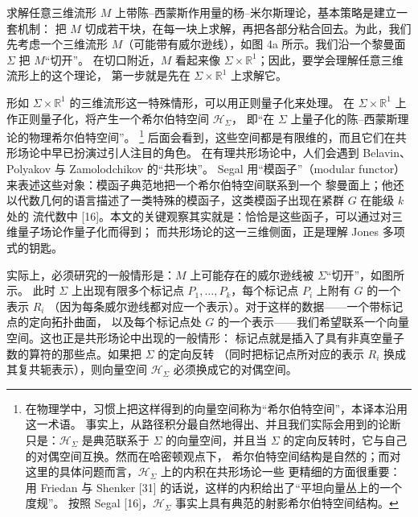 \documentclass[11pt,a4paper]{article}
\begin{document}
求解任意三维流形 $M$ 上带陈–西蒙斯作用量的杨–米尔斯理论，基本策略是建立一套机制：
把 $M$ 切成若干块，在每一块上求解，再把各部分粘合回去。为此，我们先考虑一个三维流形
$M$（可能带有威尔逊线），如图 4a 所示。我们沿一个黎曼面 $\Sigma$ 把 $M$“切开”。
在切口附近，$M$ 看起来像 $\Sigma\times\mathbb{R}^1$；因此，要学会理解任意三维流形上的这个理论，
第一步就是先在 $\Sigma\times\mathbb{R}^1$ 上求解它。

形如 $\Sigma\times\mathbb{R}^1$ 的三维流形这一特殊情形，可以用正则量子化来处理。
在 $\Sigma\times\mathbb{R}^1$ 上作正则量子化，将产生一个希尔伯特空间 $\mathcal{H}_\Sigma$，
即“在 $\Sigma$ 上量子化的陈–西蒙斯理论的物理希尔伯特空间”。%
\footnote{在物理学中，习惯上把这样得到的向量空间称为“希尔伯特空间”，本译本沿用这一术语。
事实上，从路径积分最自然地得出、并且我们实际会用到的论断只是：$\mathcal{H}_\Sigma$ 是典范联系于
$\Sigma$ 的向量空间，并且当 $\Sigma$ 的定向反转时，它与自己的对偶空间互换。然而在哈密顿观点下，
希尔伯特空间结构是自然的；而对这里的具体问题而言，$\mathcal{H}_\Sigma$ 上的内积在共形场论一些
更精细的方面很重要：用 Friedan 与 Shenker [31] 的话说，这样的内积给出了“平坦向量丛上的一个度规”。
按照 Segal [16]，$\mathcal{H}_\Sigma$ 事实上具有典范的射影希尔伯特空间结构。}
后面会看到，这些空间都是有限维的，而且它们在共形场论中早已扮演过引人注目的角色。
在有理共形场论中，人们会遇到 Belavin、Polyakov 与 Zamolodchikov 的“共形块”。
Segal 用“模函子”（modular functor）来表述这些对象：模函子典范地把一个希尔伯特空间联系到一个
黎曼面上；他还以代数几何的语言描述了一类特殊的模函子，这类模函子出现在紧群 $G$ 在能级 $k$ 处的
流代数中 [16]。本文的关键观察其实就是：恰恰是这些函子，可以通过对三维量子场论作量子化而得到；
而共形场论的这一三维侧面，正是理解 Jones 多项式的钥匙。

实际上，必须研究的一般情形是：$M$ 上可能存在的威尔逊线被 $\Sigma$“切开”，如图所示。
此时 $\Sigma$ 上出现有限多个标记点 $P_1,\dots,P_k$，每个标记点 $P_i$ 上附有 $G$ 的一个表示 $R_i$
（因为每条威尔逊线都对应一个表示）。对于这样的数据——一个带标记点的定向拓扑曲面，
以及每个标记点处 $G$ 的一个表示——我们希望联系一个向量空间。这也正是共形场论中出现的一般情形：
标记点就是插入了具有非真空量子数的算符的那些点。如果把 $\Sigma$ 的定向反转
（同时把标记点所对应的表示 $R_i$ 换成其复共轭表示），则向量空间 $\mathcal{H}_\Sigma$ 必须换成它的对偶空间。

\end{document}
